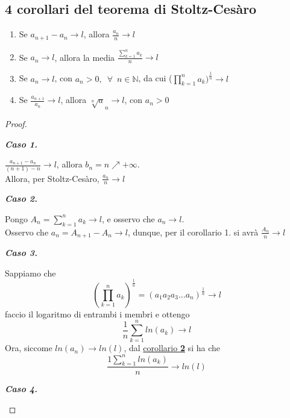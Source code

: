 \documentclass{article}
\theoremstyle{definition}
\begin{document}
\subsection{4 corollari del teorema di Stoltz-Cesàro}
    \begin{enumerate}
        \item Se $a_{n+1}-a_n \longrightarrow l$, allora $\frac{a_n}{n} \longrightarrow l$
        \item Se $a_n \longrightarrow l$, allora la media $\frac{\sum_{k=1}^na_k}{n} \longrightarrow l$
        \item Se $a_n \longrightarrow l$, con $a_n>0, \,\,\, \forall \,\,\, n \in \mathbb{N}$, da cui ($\prod_{k=1}^na_k)^{\frac{1}{n}} \longrightarrow l$
        \item Se $\frac{a_{n+1}}{a_n} \longrightarrow l$, allora $\sqrt[n]a_n \longrightarrow l$, con $a_n>0$
    \end{enumerate}
    \begin{proof}
        \begin{center}
            \textbf{\textit{Caso 1.}}
        \end{center}
        $\frac{a_{n+1}-a_n}{(n+1)-n}\longrightarrow l$, allora $b_n=n \nearrow +\infty$.
        \\
        Allora, per Stoltz-Cesàro, $\frac{a_n}{n} \longrightarrow l$
        \begin{center}
            \textbf{\textit{Caso 2.}}
        \end{center}
        Pongo $A_n=\sum_{k=1}^na_k \longrightarrow l$, e osservo che $a_n \longrightarrow l$.
        \\
        Osservo che $a_n=A_{n+1}-A_n \longrightarrow l$, dunque, per il corollario 1. si avrà $\frac{A_n}{n} \longrightarrow l$
        \begin{center}
            \textbf{\textit{Caso 3.}}
        \end{center}
        Sappiamo che 
        \begin{equation}
           ( \prod_{k=1}^na_k)^{\frac{1}{n}}=(a_1 a_2 a_3...a_n)^{\frac{1}{n}} \longrightarrow l
        \end{equation}
        faccio il logaritmo di entrambi i membri e ottengo
        \begin{equation}
           \frac{1}{n} \sum_{k=1}^nln(a_k)\longrightarrow l
        \end{equation}
        Ora, siccome $ln(a_n) \longrightarrow ln(l)$, dal \underline{corollario \textbf{2}} si ha che
        \begin{equation}
            \frac{1 \sum_{k=1}^nln(a_k)}{n}\longrightarrow ln(l)
        \end{equation}
        \begin{center}
            \textbf{\textit{Caso 4.}}
        \end{center}
    \end{proof}
\end{document}
